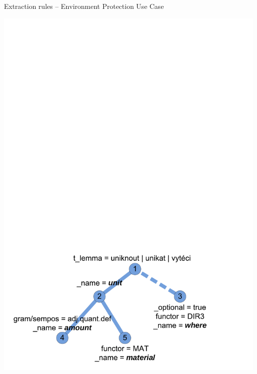 \documentclass[xcolor=dvipsnames]{beamer}
\begin{document}
\begin{frame}{Extraction rules -- Environment Protection Use Case}
\begin{center}
\includegraphics[height=0.5\vsize]{img/eenv_extr_rule}
\end{center}
\end{frame}
\end{document}
